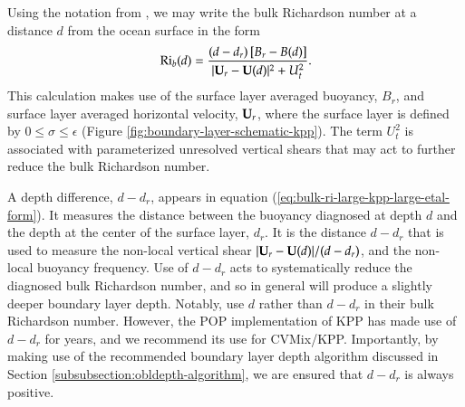 Using the notation from \cite{LargeKPP}, we may write the bulk
Richardson number at a distance $d$ from the ocean surface in the form
\begin{equation}
  \mbox{Ri}_{b} (d) = \frac{(d-d_{r}) \, [B_{r} - B(d) ]}{ |{\bf U}_{r} - {\bf U}(d)|^{2} + U_{t}^{2}}. 
\label{eq:bulk-ri-large-kpp-large-etal-form}
\end{equation}
This calculation makes use of the surface layer averaged buoyancy,
$B_{r}$, and surface layer averaged horizontal velocity, ${\bf
  U}_{r}$, where the surface layer is defined by $0 \le \sigma \le
\epsilon$ (Figure \ref{fig:boundary-layer-schematic-kpp}). The term
$U_{t}^{2}$ is associated with parameterized unresolved vertical
shears that may act to further reduce the bulk Richardson number.  

A depth difference, $d-d_{r}$, appears in equation
(\ref{eq:bulk-ri-large-kpp-large-etal-form}).  It measures the
distance between the buoyancy diagnosed at depth $d$ and the depth at
the center of the surface layer, $d_{r}$.  It is the distance
$d-d_{r}$ that is used to measure the non-local vertical shear $|{\bf
  U}_{r} - {\bf U}(d)|/(d-d_{r})$, and the non-local buoyancy
frequency.  Use of $d-d_{r}$ acts to systematically reduce the
diagnosed bulk Richardson number, and so in general will produce a
slightly deeper boundary layer depth.  Notably, \cite{LargeKPP} use
$d$ rather than $d-d_{r}$ in their bulk Richardson number.  However,
the POP implementation of KPP has made use of $d-d_{r}$ for years, and
we recommend its use for CVMix/KPP.  Importantly, by making use of the
recommended boundary layer depth algorithm discussed in Section
\ref{subsubsection:obldepth-algorithm}, we are ensured that $d-d_{r}$
is always positive.


